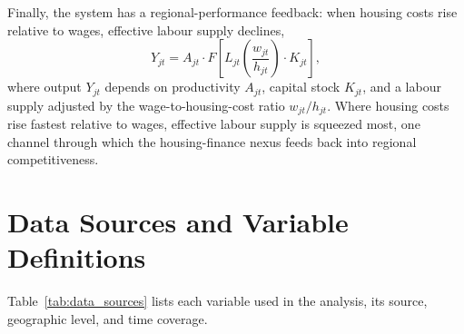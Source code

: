 \documentclass[preprint,11pt,authoryear]{elsarticle}
\begin{document}
\begin{appendices}
Finally, the system has a regional-performance feedback: when housing
costs rise relative to wages, effective labour supply declines,
\[
Y_{jt} = A_{jt} \cdot F\!\left[
L_{jt}\!\left(\frac{w_{jt}}{h_{jt}}\right) \cdot K_{jt}
\right],
\]
where output $Y_{jt}$ depends on productivity $A_{jt}$, capital stock
$K_{jt}$, and a labour supply adjusted by the wage-to-housing-cost ratio
$w_{jt}/h_{jt}$. Where housing costs rise fastest relative to wages,
effective labour supply is squeezed most, one channel through which the
housing-finance nexus feeds back into regional competitiveness.
\newpage
\section{Data Sources and Variable Definitions}

Table~\ref{tab:data_sources} lists each variable used in the analysis,
its source, geographic level, and time coverage.


\end{appendices}
\end{document}
